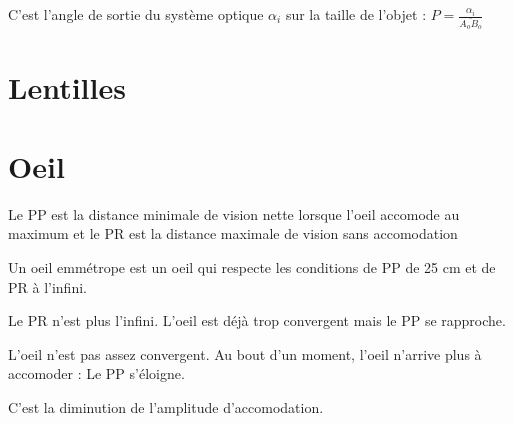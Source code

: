 \documentclass[french]{yLectureNote}
\begin{document}
\begin{definition}[Puissance]
C'est l'angle de sortie du système optique $\alpha_i$ sur la taille de l'objet : \(\displaystyle P = \frac{\alpha_i}{\bar{A_oB_o}}\)
\end{definition}
\section{Lentilles}
\section{Oeil}
\begin{definition}
Le PP est la distance minimale de vision nette lorsque l'oeil accomode au maximum et le PR est la distance maximale de vision sans accomodation
\end{definition}
\begin{definition}
Un oeil emmétrope est un oeil qui respecte les conditions de PP  de 25 cm et de PR à l'infini.
\end{definition}
\begin{definition}[Myopie]
Le PR n'est plus l'infini. L'oeil est déjà trop convergent mais le PP se rapproche.
\end{definition}
\begin{definition}[Hypermetropie]
L'oeil n'est pas assez convergent. Au bout d'un moment, l'oeil n'arrive plus à accomoder : Le PP s'éloigne.
\end{definition}
\begin{definition}[Presbycie]
C'est la diminution de l'amplitude d'accomodation.
\end{definition}
\end{document}
